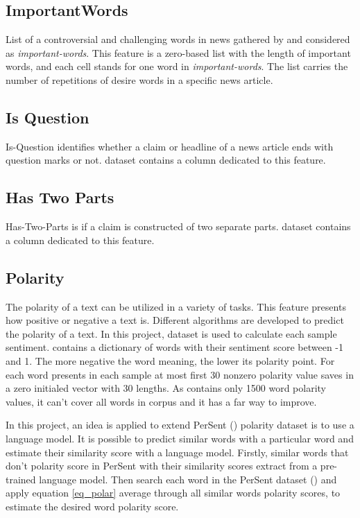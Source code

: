 \subsection{ImportantWords}
List of a controversial and challenging words in news  gathered by \cite{stance_persian} and considered as \textit{important-words}. This feature is a zero-based list with the length of important words, and each cell stands for one word in \textit{important-words}. The list carries the number of repetitions of desire words in a specific news article.
\subsection{Is Question}
Is-Question identifies whether a claim or headline of a news article ends with question marks or not. \cite{stance_persian} dataset contains a column dedicated to this feature.
\subsection{Has Two Parts}
Has-Two-Parts is if a claim is constructed of two separate parts. \cite{stance_persian} dataset contains a column dedicated to this feature.
\subsection{Polarity}  
The polarity of a text can be utilized in a variety of tasks. This feature presents how positive or negative a text is. Different algorithms are developed to predict the polarity of a text. In this project, \cite{persent} dataset is used to calculate each sample sentiment. \cite{persent} contains a dictionary of words with their sentiment score between -1 and 1. The more negative the word meaning, the lower its polarity point. For each word presents in each sample at most first 30 nonzero polarity value saves in a zero initialed vector with 30 lengths. As \cite{persent} contains only 1500 word polarity values, it can't cover all words in corpus and it has a far way to improve. 

In this project, an idea is applied to extend PerSent (\cite{persent}) polarity dataset is to use a language model. It is possible to predict similar words with a particular word and estimate their similarity score with a language model. Firstly, similar words that don't polarity score in PerSent with their similarity scores extract from a pre-trained language model. Then search each word in the PerSent dataset (\cite{persent}) and apply equation \ref{eq_polar} average through all similar words polarity scores, to estimate the desired word polarity score.

